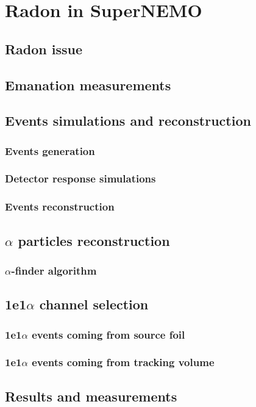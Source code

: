 \documentclass[main.tex]{subfiles}
\begin{document}
\chapter{Radon in SuperNEMO}

\section{Radon issue}

\section{Emanation measurements}

\section{Events simulations and reconstruction}
\subsection{Events generation}
\subsection{Detector response simulations}
\subsection{Events reconstruction}

\section{$\alpha$ particles reconstruction}
\subsection{$\alpha$-finder algorithm}

\section{1e1$\alpha$ channel selection}
\subsection{1e1$\alpha$ events coming from source foil}
\subsection{1e1$\alpha$ events coming from tracking volume}

\section{Results and measurements}
\end{document}
